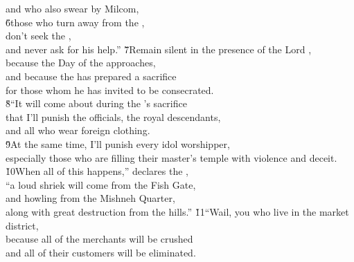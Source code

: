 \begin{poetry}
\poemll    and who also swear by Milcom, \\
\poeml \v{6}those who turn away from the , \\
\poemll    don't seek the , \\
\poemlll       and never ask for his help.''
\poeml \v{7}Remain silent in the presence of the Lord , \\
\poemll    because the Day of the  approaches, \\
\poeml and because the  has prepared a sacrifice \\
\poemll    for those whom he has invited to be consecrated. \\
\poeml \v{8}``It will come about during the 's sacrifice \\
\poemll    that I'll punish the officials, the royal descendants, \\
\poemlll       and all who wear foreign clothing. \\
\poeml \v{9}At the same time, I'll punish every idol worshipper, \\
\poemll    especially those who are filling their master's temple with violence and deceit. \\
\poeml \v{10}When all of this happens,'' declares the , \\
\poemll    ``a loud shriek will come from the Fish Gate, \\
\poeml and howling from the Mishneh Quarter, \\
\poemll    along with great destruction from the hills.''
\poeml \v{11}``Wail, you who live in the market district, \\
\poemll    because all of the merchants will be crushed \\
\poemlll       and all of their customers will be eliminated. \\

\end{poetry}
